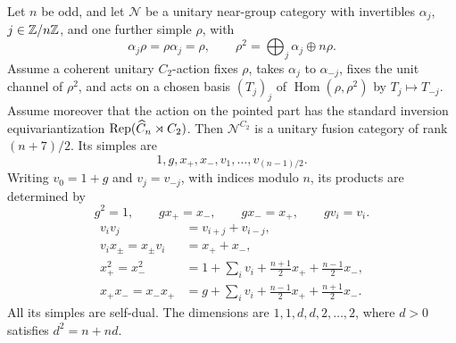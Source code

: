 \begin{proposition}
\label{prop:inversion-model}
Let $n$ be odd, and let $\mathcal N$ be a unitary near-group category with
invertibles $\alpha_j$, $j\in\mathbb Z/n\mathbb Z$, and one further simple $\rho$,
with
\[
 \alpha_j\rho=\rho\alpha_j=\rho,\qquad
 \rho^2=\bigoplus_j\alpha_j\oplus n\rho.
\]
Assume a coherent unitary $C_2$-action fixes $\rho$, takes $\alpha_j$ to
$\alpha_{-j}$, fixes the unit channel of $\rho^2$, and acts on a chosen
basis $(T_j)_j$ of $\operatorname{Hom}(\rho,\rho^2)$ by $T_j\mapsto T_{-j}$.
Assume moreover that the action on the pointed part has the standard
inversion equivariantization $\operatorname{Rep}(\widehat C_n\rtimes C_2)$.
Then $\mathcal N^{C_2}$ is a unitary fusion category of rank $(n+7)/2$.
Its simples are
\[
 1,g,x_+,x_-,v_1,\ldots,v_{(n-1)/2}.
\]
Writing $v_0=1+g$ and $v_j=v_{-j}$, with indices modulo $n$, its products
are determined by
\[
 g^2=1,\qquad gx_+=x_-,\qquad gx_-=x_+,\qquad gv_i=v_i.
\]
\begin{align*}
 v_i v_j&=v_{i+j}+v_{i-j},\\
 v_i x_\pm=x_\pm v_i&=x_++x_-,\\
 x_+^2=x_-^2
 &=1+\sum_i v_i+\frac{n+1}{2}x_++\frac{n-1}{2}x_-,\\
 x_+x_-=x_-x_+
 &=g+\sum_i v_i+\frac{n-1}{2}x_++\frac{n+1}{2}x_-.
\end{align*}
All its simples are self-dual. The dimensions are $1,1,d,d,2,\ldots,2$,
where $d>0$ satisfies $d^2=n+nd$.
\end{proposition}
